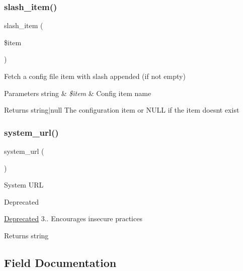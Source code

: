 \subsubsection{\texorpdfstring{slash\+\_\+item()}{slash\_item()}}
{\footnotesize\ttfamily slash\+\_\+item (\begin{DoxyParamCaption}\item[{}]{\$item }\end{DoxyParamCaption})}

Fetch a config file item with slash appended (if not empty)


\begin{DoxyParams}[1]{Parameters}
string & {\em \$item} & Config item name \\
\hline
\end{DoxyParams}
\begin{DoxyReturn}{Returns}
string$\vert$null The configuration item or N\+U\+LL if the item doesn\textquotesingle{}t exist 
\end{DoxyReturn}
\mbox{\label{class_c_i___config_a71e857f8dd38c230f1ce11bacf177ba8}} 
\subsubsection{\texorpdfstring{system\+\_\+url()}{system\_url()}}
{\footnotesize\ttfamily system\+\_\+url (\begin{DoxyParamCaption}{ }\end{DoxyParamCaption})}

System U\+RL

\begin{DoxyRefDesc}{Deprecated}
\item[\mbox{\hyperlink{deprecated__deprecated000001}{Deprecated}}]3.. Encourages insecure practices \end{DoxyRefDesc}
\begin{DoxyReturn}{Returns}
string 
\end{DoxyReturn}


\subsection{Field Documentation}
\mbox{\label{class_c_i___config_a5f47dbd2111b5bb6c91ece69fefebf26}} 

